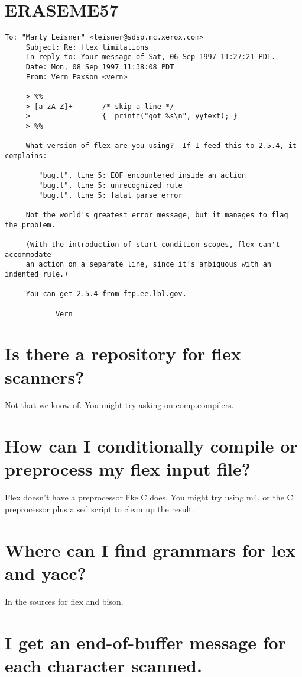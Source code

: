 \documentclass[openany,oneside]{book}
\begin{document}
\section{ERASEME57}

\begin{verbatim}
To: "Marty Leisner" <leisner@sdsp.mc.xerox.com>
     Subject: Re: flex limitations
     In-reply-to: Your message of Sat, 06 Sep 1997 11:27:21 PDT.
     Date: Mon, 08 Sep 1997 11:38:08 PDT
     From: Vern Paxson <vern>
     
     > %%
     > [a-zA-Z]+       /* skip a line */
     >                 {  printf("got %s\n", yytext); }
     > %%
     
     What version of flex are you using?  If I feed this to 2.5.4, it complains:
     
     	"bug.l", line 5: EOF encountered inside an action
     	"bug.l", line 5: unrecognized rule
     	"bug.l", line 5: fatal parse error
     
     Not the world's greatest error message, but it manages to flag the problem.
     
     (With the introduction of start condition scopes, flex can't accommodate
     an action on a separate line, since it's ambiguous with an indented rule.)
     
     You can get 2.5.4 from ftp.ee.lbl.gov.
     
     		Vern
\end{verbatim}

\section{Is there a repository for flex scanners?}


Not that we know of. You might try asking on comp.compilers.
\section{How can I conditionally compile or preprocess my flex input file?}


Flex doesn't have a preprocessor like C does.  You might try using m4, or the C
preprocessor plus a sed script to clean up the result.
\section{Where can I find grammars for lex and yacc?}


In the sources for flex and bison.
\section{I get an end-of-buffer message for each character scanned.}
\end{document}
